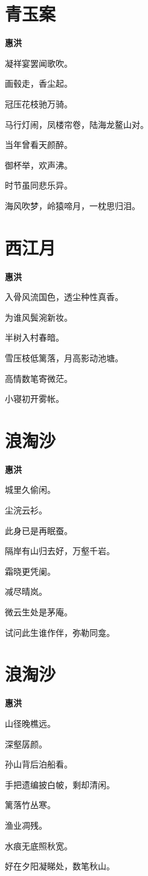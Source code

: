\documentclass[12pt,a4paper]{ctexbook}
\begin{document}
\section{青玉案}
\textbf{惠洪}\par\vspace{0.5em}
凝祥宴罢闻歌吹。\par
画毂走，香尘起。\par
冠压花枝驰万骑。\par
马行灯闹，凤楼帘卷，陆海龙鳌山对。\par
当年曾看天颜醉。\par
御杯举，欢声沸。\par
时节虽同悲乐异。\par
海风吹梦，岭猿啼月，一枕思归泪。\par

\section{西江月}
\textbf{惠洪}\par\vspace{0.5em}
入骨风流国色，透尘种性真香。\par
为谁风鬓涴新妆。\par
半树入村春暗。\par
雪压枝低篱落，月高影动池塘。\par
高情数笔寄微茫。\par
小寝初开雾帐。\par

\section{浪淘沙}
\textbf{惠洪}\par\vspace{0.5em}
城里久偷闲。\par
尘浣云衫。\par
此身已是再眠蚕。\par
隔岸有山归去好，万壑千岩。\par
霜晓更凭阑。\par
减尽晴岚。\par
微云生处是茅庵。\par
试问此生谁作伴，弥勒同龛。\par

\section{浪淘沙}
\textbf{惠洪}\par\vspace{0.5em}
山径晚樵远。\par
深壑孱颜。\par
孙山背后泊船看。\par
手把遗编披白帔，剩却清闲。\par
篱落竹丛寒。\par
渔业凋残。\par
水痕无底照秋宽。\par
好在夕阳凝睇处，数笔秋山。\par
\end{document}
